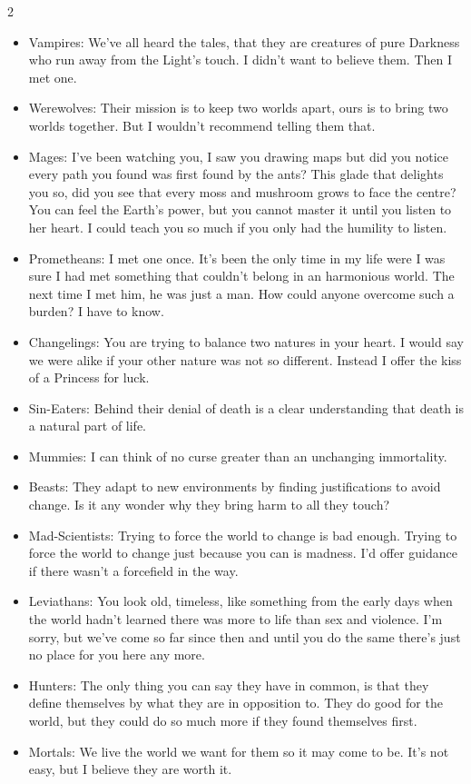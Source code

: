 \begin{multicols}{2}
\begin{itemize}
\item Vampires: We’ve all heard the tales, that they are creatures of pure Darkness who run away from the Light’s touch. I didn’t want to believe them. Then I met one.
\item Werewolves: Their mission is to keep two worlds apart, ours is to bring two worlds together. But I wouldn't recommend telling them that. 
\item Mages: I've been watching you, I saw you drawing maps but did you notice every path you found was first found by the ants? This glade that delights you so, did you see that every moss and mushroom grows to face the centre? You can feel the Earth's power, but you cannot master it until you listen to her heart. I could teach you so much if you only had the humility to listen.
\item Prometheans: I met one once. It’s been the only time in my life were I was sure I had met something that couldn’t belong in an harmonious world. The next time I met him, he was just a man. How could anyone overcome such a burden? I have to know.
\item Changelings: You are trying to balance two natures in your heart. I would say we were alike if your other nature was not so different. Instead I offer the kiss of a Princess for luck.
\item Sin-Eaters: Behind their denial of death is a clear understanding that death is a natural part of life. 
\item Mummies: I can think of no curse greater than an unchanging immortality.  
\item Beasts: They adapt to new environments by finding justifications to avoid change. Is it any wonder why they bring harm to all they touch?
\item Mad-Scientists: Trying to force the world to change is bad enough. Trying to force the world to change just because you can is madness. I'd offer guidance if there wasn't a forcefield in the way.
\item Leviathans: You look old, timeless, like something from the early days when the world hadn't learned there was more to life than sex and violence. I'm sorry, but we've come so far since then and until you do the same there's just no place for you here any more.

\item Hunters: The only thing you can say they have in common, is that they define themselves by what they are in opposition to. They do good for the world, but they could do so much more if they found themselves first.
\item Mortals: We live the world we want for them so it may come to be. It’s not easy, but I believe they are worth it. \end{itemize}


\end{multicols}
